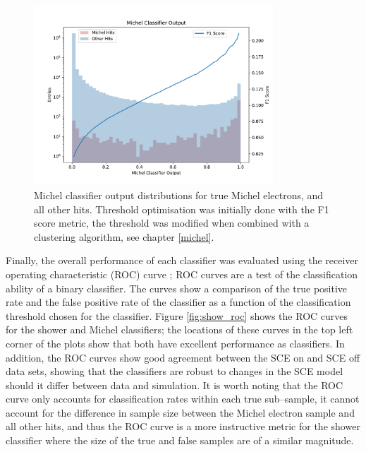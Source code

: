 \begin{figure}[h]
	\centering
	\includegraphics[width=0.8\textwidth]{figures/michel_combined.pdf} 
	\caption[Michel classifier output distributions.]{Michel classifier output
	distributions for true Michel electrons, and all other hits. Threshold
	optimisation was initially done with the F1 score metric, the threshold was
	modified when combined with a clustering algorithm, see chapter
	\ref{michel}.}
	\label{fig:michel_output}
\end{figure}

Finally, the overall performance of each classifier was evaluated using the
receiver operating characteristic (ROC) curve \cite{Fawcett2006}; ROC curves are
a test of the classification ability of a binary classifier. The curves show a
comparison of the true positive rate and the false positive rate of the
classifier as a function of the classification threshold chosen for the
classifier. Figure \ref{fig:show_roc} shows the ROC curves for the shower and
Michel classifiers; the locations of these curves in the top left corner of the
plots show that both have excellent performance as classifiers. In addition, the
ROC curves show good agreement between the SCE on and SCE off data sets, showing
that the classifiers are robust to changes in the SCE model should it differ
between data and simulation. It is worth noting that the ROC curve only accounts
for classification rates within each true sub--sample, it cannot account for the
difference in sample size between the Michel electron sample and all other hits,
and thus the ROC curve is a more instructive metric for the shower classifier
where the size of the true and false samples are of a similar magnitude.

\vspace{-5mm}


